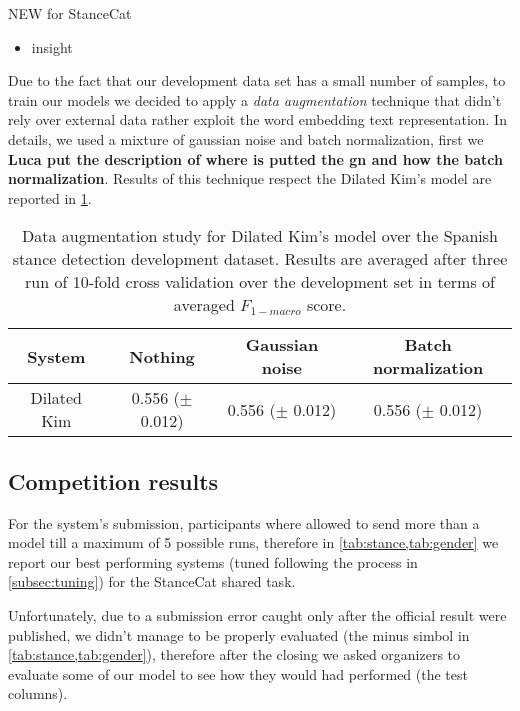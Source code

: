 NEW for StanceCat
\begin{itemize}
	\item insight
\end{itemize}


Due to the fact that our development data set has a small number of samples, to train our models we decided to apply a \emph{data augmentation} technique that didn't rely over external data rather exploit the word embedding text representation. In details, we used a mixture of gaussian noise and batch normalization, first we \textbf{Luca put the description of where is putted the gn and how the batch normalization}. Results of this technique respect the Dilated Kim's model are reported in \cref{tab:augmentation}.

\begin{table}[h]
\footnotesize
\caption{Data augmentation study for Dilated Kim's model over the Spanish stance detection development dataset. Results are averaged after three run of 10-fold cross validation over the development set in terms of averaged $F_{1-macro}$ score. }
\label{tab:augmentation}
\centering
\begin{tabular}{c|ccc}
\toprule
\hline
System		& Nothing	& Gaussian noise	& Batch normalization	\\
\hline
Dilated Kim	& 0.556 ($\pm$ 0.012) & 0.556 ($\pm$ 0.012)	& 0.556 ($\pm$ 0.012)	\\
\hline
\bottomrule
\end{tabular}
\end{table}


\subsection{Competition results} \label{subsec:results}

For the system's submission, participants where allowed to send more than a model till a maximum of 5 possible runs, therefore in \cref{tab:stance,tab:gender} we report our best performing systems (tuned following the process in \cref{subsec:tuning}) for the StanceCat shared task.

Unfortunately, due to a submission error caught only after the official result were published, we didn't manage to be properly evaluated (the minus simbol in \cref{tab:stance,tab:gender}), therefore after the closing we asked organizers to evaluate some of our model to see how they would had performed (the test columns).

